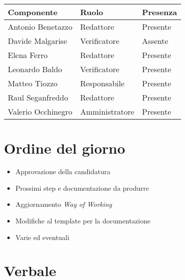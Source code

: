 \documentclass[italian,12pt]{article} %
\begin{document}
\begin{flushleft}
	\begin{table}[!h]
		\begin{tabular}{ |l|l|l| }
			\hline
			\textbf{Componente} & \textbf{Ruolo} & \textbf{Presenza} \\
			\hline
			Antonio Benetazzo   & Redattore      & Presente          \\
			Davide Malgarise    & Verificatore   & Assente           \\
			Elena Ferro         & Redattore      & Presente          \\
			Leonardo Baldo      & Verificatore   & Presente          \\
			Matteo Tiozzo       & Responsabile   & Presente          \\
			Raul Seganfreddo    & Redattore      & Presente          \\
			Valerio Occhinegro  & Amministratore & Presente          \\
			\hline
		\end{tabular}
	\end{table}
\end{flushleft}

\section{Ordine del giorno}
\begin{itemize}
	\itemsep0em
	\item Approvazione della candidatura
	\item Prossimi step e documentazione da produrre
	\item Aggiornamento \textit{Way of Working}
	\item Modifiche al template per la documentazione
	\item Varie ed eventuali
\end{itemize}

\newpage

\section{Verbale}
\end{document}
